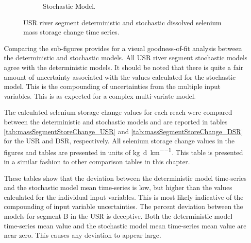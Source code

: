 \begin{linenumbers}
\begin{landscape}
\begin{figure}
\begin{subfigure}{0.7\textwidth}
			\caption{Stochastic Model.}
		\end{subfigure}
		\caption{USR river segment deterministic and stochastic dissolved selenium mass storage change time series.}
	\end{figure}
\end{landscape}
\subfiguretop

Comparing the sub-figures provides for a visual goodness-of-fit analysis between the deterministic and stochastic models.  All USR river segment stochastic models agree with the deterministic models.  It should be noted that there is quite a fair amount of uncertainty associated with the values calculated for the stochastic model.  This is the compounding of uncertainties from the multiple input variables.  This is as expected for a complex multi-variate model.

The calculated selenium storage change values for each reach were compared between the deterministic and stochastic models and are reported in tables \ref{tab:massSegmentStoreChange_USR} and \ref{tab:massSegmentStoreChange_DSR} for the USR and DSR, respectively.  All selenium storage change values in the figures and tables are presented in units of \si{\kilo\gram\per\day\per\kilo\meter}.  This table is presented in a similar fashion to other comparison tables in this chapter.

These tables show that the deviation between the deterministic model time-series and the stochastic model mean time-series is low, but higher than the values calculated for the individual input variables.  This is most likely indicative of the compounding of input variable uncertainties.  The percent deviation between the models for segment B in the USR is deceptive.  Both the deterministic model time-series mean value and the stochastic model mean time-series mean value are near zero.  This causes any deviation to appear large.


\end{linenumbers}
